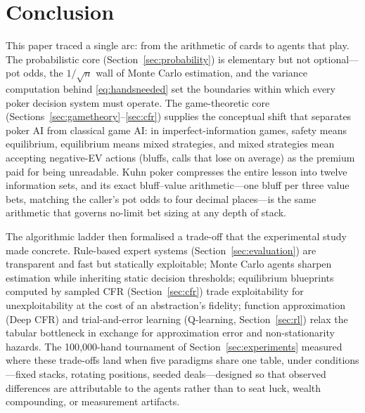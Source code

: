\section{Conclusion}\label{sec:conclusion}

This paper traced a single arc: from the arithmetic of cards to agents that play. The probabilistic core (Section~\ref{sec:probability}) is elementary but not optional---pot odds, the $1/\sqrt{n}$ wall of Monte Carlo estimation, and the variance computation behind \eqref{eq:handsneeded} set the boundaries within which every poker decision system must operate. The game-theoretic core (Sections~\ref{sec:gametheory}--\ref{sec:cfr}) supplies the conceptual shift that separates poker AI from classical game AI: in imperfect-information games, safety means equilibrium, equilibrium means mixed strategies, and mixed strategies mean accepting negative-EV actions (bluffs, calls that lose on average) as the premium paid for being unreadable. Kuhn poker compresses the entire lesson into twelve information sets, and its exact bluff--value arithmetic---one bluff per three value bets, matching the caller's pot odds to four decimal places---is the same arithmetic that governs no-limit bet sizing at any depth of stack.

The algorithmic ladder then formalised a trade-off that the experimental study made concrete. Rule-based expert systems (Section~\ref{sec:evaluation}) are transparent and fast but statically exploitable; Monte Carlo agents sharpen estimation while inheriting static decision thresholds; equilibrium blueprints computed by sampled CFR (Section~\ref{sec:cfr}) trade exploitability for unexploitability at the cost of an abstraction's fidelity; function approximation (Deep CFR) and trial-and-error learning (Q-learning, Section~\ref{sec:rl}) relax the tabular bottleneck in exchange for approximation error and non-stationarity hazards. The 100{,}000-hand tournament of Section~\ref{sec:experiments} measured where these trade-offs land when five paradigms share one table, under conditions---fixed stacks, rotating positions, seeded deals---designed so that observed differences are attributable to the agents rather than to seat luck, wealth compounding, or measurement artifacts.

